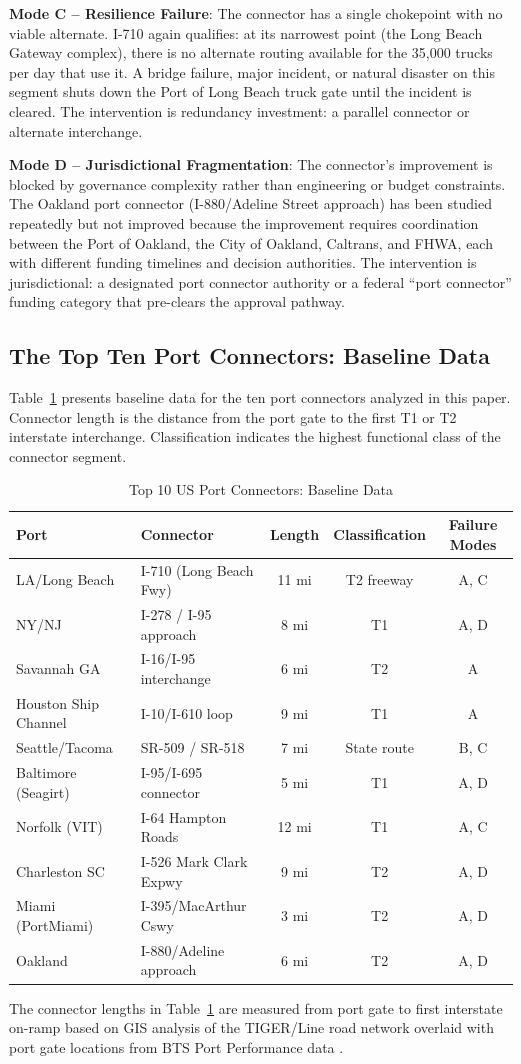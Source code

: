 \textbf{Mode C -- Resilience Failure}: The connector has a single chokepoint with no viable alternate. I-710 again qualifies: at its narrowest point (the Long Beach Gateway complex), there is no alternate routing available for the 35,000 trucks per day that use it. A bridge failure, major incident, or natural disaster on this segment shuts down the Port of Long Beach truck gate until the incident is cleared. The intervention is redundancy investment: a parallel connector or alternate interchange.

\textbf{Mode D -- Jurisdictional Fragmentation}: The connector's improvement is blocked by governance complexity rather than engineering or budget constraints. The Oakland port connector (I-880/Adeline Street approach) has been studied repeatedly but not improved because the improvement requires coordination between the Port of Oakland, the City of Oakland, Caltrans, and FHWA, each with different funding timelines and decision authorities. The intervention is jurisdictional: a designated port connector authority or a federal ``port connector'' funding category that pre-clears the approval pathway.

\subsection{The Top Ten Port Connectors: Baseline Data}

Table~\ref{tab:connectors} presents baseline data for the ten port connectors analyzed in this paper. Connector length is the distance from the port gate to the first T1 or T2 interstate interchange. Classification indicates the highest functional class of the connector segment.

\begin{table}[h]
\centering
\caption{Top 10 US Port Connectors: Baseline Data}
\label{tab:connectors}
\begin{tabular}{llccc}
\toprule
Port & Connector & Length & Classification & Failure Modes \\
\midrule
LA/Long Beach & I-710 (Long Beach Fwy) & 11 mi & T2 freeway & A, C \\
NY/NJ & I-278 / I-95 approach & 8 mi & T1 & A, D \\
Savannah GA & I-16/I-95 interchange & 6 mi & T2 & A \\
Houston Ship Channel & I-10/I-610 loop & 9 mi & T1 & A \\
Seattle/Tacoma & SR-509 / SR-518 & 7 mi & State route & B, C \\
Baltimore (Seagirt) & I-95/I-695 connector & 5 mi & T1 & A, D \\
Norfolk (VIT) & I-64 Hampton Roads & 12 mi & T1 & A, C \\
Charleston SC & I-526 Mark Clark Expwy & 9 mi & T2 & A, D \\
Miami (PortMiami) & I-395/MacArthur Cswy & 3 mi & T2 & A, D \\
Oakland & I-880/Adeline approach & 6 mi & T2 & A, D \\
\bottomrule
\end{tabular}
\end{table}

The connector lengths in Table~\ref{tab:connectors} are measured from port gate to first interstate on-ramp based on GIS analysis of the TIGER/Line road network \citep{Census_TIGER2023} overlaid with port gate locations from BTS Port Performance data \citep{BTS_airfreight2023}.
